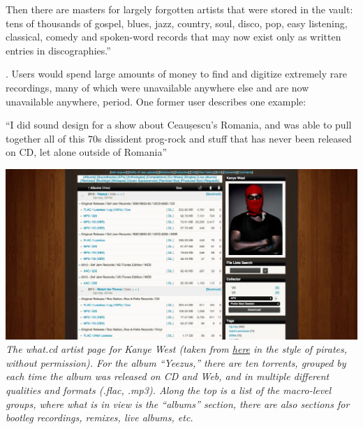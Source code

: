 \documentclass[11pt]{article}
\begin{document}
\begin{multicols}{2}
{\begin{leftbar}
  Then there are masters for largely forgotten artists that were stored
  in the vault: tens of thousands of gospel, blues, jazz, country, soul,
  disco, pop, easy listening, classical, comedy and spoken-word records
  that may now exist only as written entries in discographies.'' \cite{rosenDayMusicBurned2019} 
  \end{leftbar}}. Users would spend large amounts of money to find and
digitize extremely rare recordings, many of which were unavailable
anywhere else and are now unavailable anywhere, period. One former user
describes one example:

\begin{leftbar}
``I did sound design for a show about Ceaușescu's Romania, and was able
to pull together all of this 70s dissident prog-rock and stuff that has
never been released on CD, let alone outside of Romania'' \cite{sonnadEulogyWhatCd2016} 
\end{leftbar}

\includegraphics[width=\linewidth]{../assets/images/kanye-what.png} \emph{The
what.cd artist page for Kanye West (taken from
\href{https://qz.com/840661/what-cd-is-gone-a-eulogy-for-the-greatest-music-collection-in-the-world/}{here}
in the style of pirates, without permission). For the album ``Yeezus,''
there are ten torrents, grouped by each time the album was released on
CD and Web, and in multiple different qualities and formats (.flac,
.mp3). Along the top is a list of the macro-level groups, where what is
in view is the ``albums'' section, there are also sections for bootleg
recordings, remixes, live albums, etc.}


\end{multicols}
\end{document}
